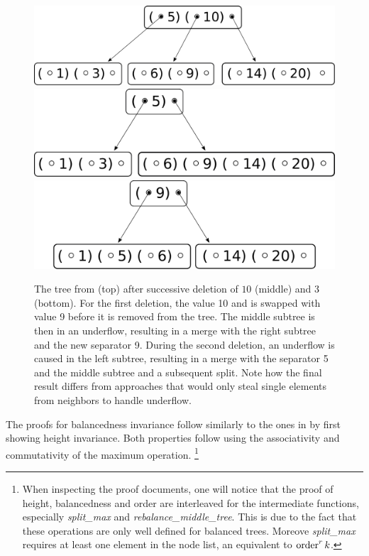 \begin{figure}
    \centering
    \includegraphics[width=0.54\linewidth]{figures/btree-basic-ins9-ins1.pdf}\\
    \vspace*{1cm}
    \includegraphics[width=0.48\linewidth]{figures/btree-basic-ins9-ins1-del10.pdf}\\
    \vspace*{1cm}
    \includegraphics[width=0.48\linewidth]{figures/btree-basic-ins9-ins1-del10-del3.pdf}
    \caption[An example B-Tree after two deletion operations]{The tree from  (top) after 
    successive deletion of $10$ (middle) and $3$ (bottom).
    For the first deletion, the value 10 and is swapped with value 9 before it is removed from the tree.
    The middle subtree is then in an underflow, resulting in a merge with the right subtree and the new separator 9.
    During the second deletion, an underflow is caused in the left subtree,
    resulting in a merge with the separator 5 and the middle subtree and a subsequent split.
    Note how the final result differs from approaches that would only steal single elements
    from neighbors to handle underflow.}
    \label{fig:btree-basic-del}
\end{figure}

The proofs for balancedness invariance follow similarly to
the ones in  by first showing height invariance.
Both properties follow using the associativity
and commutativity of the maximum operation.
\footnote{
    When inspecting the proof documents,
    one will notice that the proof of height, balancedness and order
    are interleaved for the
    intermediate functions, especially
    \textit{split\_max} and \textit{rebalance\_middle\_tree}.
    This is due to the fact that these operations
    are only well defined for balanced trees.
    Moreove \textit{split\_max} requires at least
    one element in the node list, an equivalent
    to $\operatorname{order}^r k$.
}

